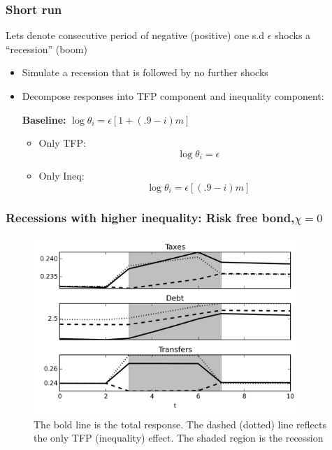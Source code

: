 \documentclass{beamer}
\begin{document}
\begin{frame}
\frametitle{Short run}
Lets denote consecutive period of negative (positive) one s.d $\epsilon$ shocks a ``recession'' (boom)

\begin{itemize}
\item Simulate a recession that is followed by no further shocks
 
 \item Decompose responses into TFP component and inequality component:
  
 \vspace{3mm}
\centering  \textbf{Baseline:} $\log \theta_i=\epsilon [1+(.9-i)m]$
 \vspace{3mm}
 \begin{itemize}
  \item Only TFP: \[\log \theta_i=\epsilon\]
  \item Only Ineq: \[\log \theta_i=\epsilon [(.9-i)m]\]
\end{itemize}

\end{itemize}
 
\end{frame}


\begin{frame}
\frametitle{Recessions with higher inequality: Risk free bond,$\chi=0$}
{
  \begin{figure}
    \centering
    \includegraphics[width = 0.9\textwidth]{plots/irf_zero_chi_shocks.png}
    \caption{The bold line is the total response. The dashed (dotted) line reflects the only TFP (inequality) effect. The shaded region is the recession}
  \end{figure}

} 
\end{frame}
\end{document}
